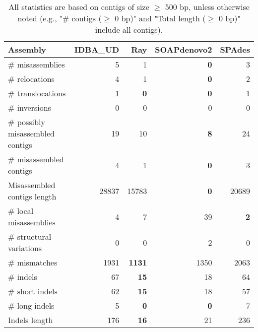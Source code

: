 \documentclass[12pt,a4paper]{article}
\begin{document}
\begin{table}[ht]
\begin{center}
\caption{All statistics are based on contigs of size $\geq$ 500 bp, unless otherwise noted (e.g., "\# contigs ($\geq$ 0 bp)" and "Total length ($\geq$ 0 bp)" include all contigs).}
\begin{tabular}{|l*{4}{|r}|}
\hline
Assembly & IDBA\_UD & Ray & SOAPdenovo2 & SPAdes \\ \hline
\# misassemblies & 5 & 1 & {\bf 0} & 3 \\ \hline
\hspace{5mm}\# relocations & 4 & 1 & {\bf 0} & 2 \\ \hline
\hspace{5mm}\# translocations & 1 & {\bf 0} & {\bf 0} & 1 \\ \hline
\hspace{5mm}\# inversions & 0 & 0 & 0 & 0 \\ \hline
\# possibly misassembled contigs & 19 & 10 & {\bf 8} & 24 \\ \hline
\# misassembled contigs & 4 & 1 & {\bf 0} & 3 \\ \hline
Misassembled contigs length & 28837 & 15783 & {\bf 0} & 20689 \\ \hline
\# local misassemblies & 4 & 7 & 39 & {\bf 2} \\ \hline
\# structural variations & 0 & 0 & 2 & 0 \\ \hline
\# mismatches & 1931 & {\bf 1131} & 1350 & 2063 \\ \hline
\# indels & 67 & {\bf 15} & 18 & 64 \\ \hline
\hspace{5mm}\# short indels & 62 & {\bf 15} & 18 & 57 \\ \hline
\hspace{5mm}\# long indels & 5 & {\bf 0} & {\bf 0} & 7 \\ \hline
Indels length & 176 & {\bf 16} & 21 & 236 \\ \hline
\end{tabular}
\end{center}
\end{table}
\end{document}
